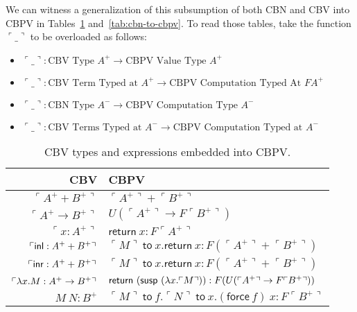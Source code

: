 \documentclass{article}
\newcommand{\exsusp}[1]{\mathsf{susp}~#1}
\newcommand{\exreturn}[1]{\mathsf{return}~#1}
\newcommand{\exforce}[1]{\mathsf{force}~#1}
\newcommand{\exto}[2]{#1~\mathsf{to}~#2}
\newcommand{\transl}[1]{\ulcorner #1 \urcorner}
\begin{document}
We can witness a generalization of this subsumption of both CBN and CBV into CBPV in Tables~\ref{tab:cbv-to-cbpv} and~\ref{tab:cbn-to-cbpv}. To read those tables, take the function $\transl{\_}$ to be overloaded as follows:
\begin{itemize}
    \item $\transl{\_} : \text{CBV Type $A^+$} \to \text{CBPV Value Type $A^+$}$
    \item $\transl{\_} : \text{CBV Term Typed at  $A^+$} \to \text{CBPV Computation Typed At $FA^+$}$
    \item $\transl{\_} : \text{CBN Type $A^-$} \to \text{CBPV Computation Type $A^-$}$
    \item $\transl{\_} : \text{CBV Terms Typed at $A^-$} \to \text{CBPV Computation Typed at $A^-$}$
\end{itemize}

\begin{table}[]
    \centering
    \def\arraystretch{1.5}
    \begin{tabular}{r|l}
         CBV & CBPV \\
         \hline 
         $\transl{A^+ + B^+}$ & $\transl{A^+} + \transl{B^+}$ \\
         $\transl{A^+ \to B^+}$ & $U(\transl{A^+} \to F\transl{B^+})$ \\
         $\transl{x : A^+}$ & $\exreturn{x} : F\transl{A^+}$ \\
         $\transl{\exinl{M} : A^+ + B^+}$ & $\exto{\transl{M}}{x.\exreturn{x}} : F(\transl{A^+} + \transl{B^+})$ \\
         $\transl{\exinr{M} : A^+ + B^+}$ & $\exto{\transl{M}}{x.\exreturn{x}} : F(\transl{A^+} + \transl{B^+})$ \\
         $\transl{\exlam{x}.M : A^+ \to B^+}$ & $\exreturn{(\exsusp{(\exlam{x}.\transl{M})})} : F(U(\transl{A^+} \to F\transl{B^+}))$ \\
         $M~N : B^+$ & $\exto{\transl{M}}{f.\exto{\transl{N}}{x.(\exforce{f})~x}} : F\transl{B^+}$
    \end{tabular}
    \caption{CBV types and expressions embedded into CBPV.}
    \label{tab:cbv-to-cbpv}
\end{table}
\end{document}

